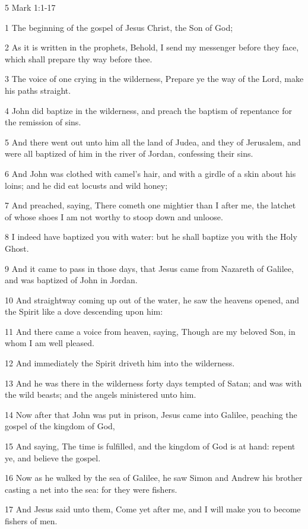 
5 Mark 1:1-17

1 The beginning of the gospel of Jesus Christ, the Son of God;

2 As it is written in the prophets, Behold, I send my messenger before they face,
which shall prepare thy way before thee.

3 The voice of one crying in the wilderness, Prepare ye the way of the Lord, make
his paths straight.

4 John did baptize in the wilderness, and preach the baptism of repentance for
the remission of sins.

5 And there went out unto him all the land of Judea, and they of Jerusalem, and
were all baptized of him in the river of Jordan, confessing their sins.

6 And John was clothed with camel's hair, and with a girdle of a skin about his
loins; and he did eat locusts and wild honey;

7 And preached, saying, There cometh one mightier than I after me, the latchet
of whose shoes I am not worthy to stoop down and unloose.

8 I indeed have baptized you with water: but he shall baptize you with the Holy
Ghost.

9 And it came to pass in those days, that Jesus came from Nazareth of Galilee,
and was baptized of John in Jordan.

10 And straightway coming up out of the water, he saw the heavens opened, and the
Spirit like a dove descending upon him:

11 And there came a voice from heaven, saying, Though are my beloved Son, in whom
I am well pleased.

12 And immediately the Spirit driveth him into the wilderness.

13 And he was there in the wilderness forty days tempted of Satan; and was with
the wild beasts; and the angels ministered unto him.

14 Now after that John was put in prison, Jesus came into Galilee, peaching the
gospel of the kingdom of God,

15 And saying, The time is fulfilled, and the kingdom of God is at hand: repent
ye, and believe the gospel.

16 Now as he walked by the sea of Galilee, he saw Simon and Andrew his brother
casting a net into the sea: for they were fishers.

17 And Jesus said unto them, Come yet after me, and I will make you to become fishers
of men.


